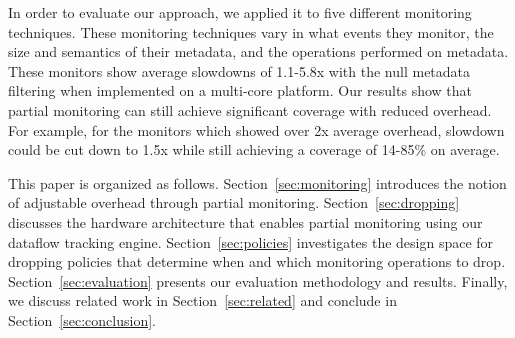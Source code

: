 
In order to evaluate our approach, we applied it to five different monitoring
techniques. These monitoring techniques vary in what events they monitor, the
size and semantics of their metadata, and the operations performed on metadata.
These monitors show average slowdowns of 1.1-5.8x with the null metadata filtering when
implemented on a multi-core platform.
Our results show that partial monitoring can still achieve significant
coverage with reduced overhead. For example, for the monitors which showed over 2x
average overhead, slowdown could be cut down to 1.5x while still achieving a
coverage of 14-85\% on average.

This paper is organized as follows. Section~\ref{sec:monitoring} introduces the notion
of adjustable overhead through partial monitoring.
Section~\ref{sec:dropping} discusses the hardware architecture that enables 
partial monitoring using our dataflow tracking engine.
Section~\ref{sec:policies}
investigates the design space for dropping policies that determine when and which
monitoring operations to drop.
Section~\ref{sec:evaluation} presents our evaluation methodology and
results. Finally, we discuss related work in Section~\ref{sec:related} and
conclude in Section~\ref{sec:conclusion}.

